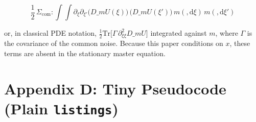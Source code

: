 \documentclass[11pt,letterpaper,oneside]{article}
\numberwithin{equation}{section}
\newcommand{\1}{\mathbf{1}}
\newcommand{\diff}{,\mathrm{d}}
\newcommand{\dmU}{D\_m U}
\newcommand{\Dm}{D\_m}
\begin{document}
$$
\frac{1}{2}\,\Sigma_{\mathrm{com}}:\!\int\!\!\int
\partial_{\xi}\partial_{\xi'} \big(\Dm U(\xi)\big)\,\big(\Dm U(\xi')\big)
\, m(\diff \xi)\, m(\diff \xi')
$$

or, in classical PDE notation,
$\tfrac12 \mathrm{Tr}\big[\Gamma\,\partial_{\xi\xi}^2 \dmU\big]$
integrated against $m$, where $\Gamma$ is the covariance of the common noise. Because this paper conditions on $x$, these terms are absent in the stationary master equation.

\section{Appendix D: Tiny Pseudocode (Plain \texorpdfstring{\texttt{listings}}{listings})}\label{app:code}

\lstset{
basicstyle=\ttfamily\small,
columns=fullflexible,
showstringspaces=false,
frame=single,
framerule=0.4pt,
breaklines=true,
tabsize=2,
captionpos=b
}
\end{document}
